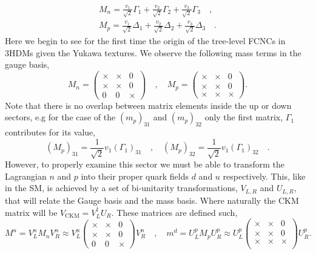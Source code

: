 % 
\begin{equation}
\label{eq:3HDM_Quark_gauge_mass}
\begin{split}
M_n = \frac{v_1}{\sqrt{2}} \Gamma_1 +  \frac{v_2}{\sqrt{2}} \Gamma_2 +  \frac{v_3}{\sqrt{2}} \Gamma_3  \quad , \\ 
M_p = \frac{v_1}{\sqrt{2}} \Delta_1 +  \frac{v_2}{\sqrt{2}} \Delta_2 +  \frac{v_3}{\sqrt{2}} \Delta_3   \quad .
\end{split}
\end{equation}
%
Here we begin to see for the first time the origin of the tree-level FCNCs in 3HDMs given the Yukawa textures. We observe the following mass terms in the gauge basis, 
%
\begin{equation}
M_n = \begin{pmatrix}
\times & \times & 0 \\
\times & \times & 0 \\
0 & 0 & \times 
\end{pmatrix} 
\quad , \quad 
M_p=\begin{pmatrix}
\times & \times & 0 \\
\times & \times & 0 \\
\times & \times & \times 
\end{pmatrix} .
\end{equation}
%
Note that there is no overlap between matrix elements inside the up or down sectors, e.g for the case of the $(m_p)_{31}$ and $(m_p)_{32}$ only the first matrix, $\Gamma_1$ contributes for its value, 
\begin{equation}
(M_p)_{31} = \frac{1}{\sqrt{2}} v_1 (\Gamma_1)_{31} \quad , \quad (M_p)_{32} = \frac{1}{\sqrt{2}} v_1 (\Gamma_1)_{32} \quad . 
\end{equation}
%
However, to properly examine this sector we must be able to transform the Lagrangian $n$ and $p$ into their proper quark fields $d$ and $u$ respectively. 
%
This, like in the SM, is achieved by a set of bi-unitarity transformations, $V_{L,R}$ and $U_{L,R}$, that will relate the Gauge basis and the mass basis. Where naturally the CKM matrix will be $V_{\text{CKM}} = V_L^\dagger U_R$. These matrices are defined such, 
%
\begin{equation}
M^u = V_L^n M_n V_R^n \approx V_L^n \begin{pmatrix}
\times & \times & 0 \\
\times & \times & 0 \\
0 & 0 & \times 
\end{pmatrix}  V_R^n  \quad , \quad 
m^d = U_L^p  M_p U_R^p \approx U_L^p \begin{pmatrix}
\times & \times & 0 \\
\times & \times & 0 \\
\times & \times & \times \\ \end{pmatrix} U_R^p . 
\end{equation}
